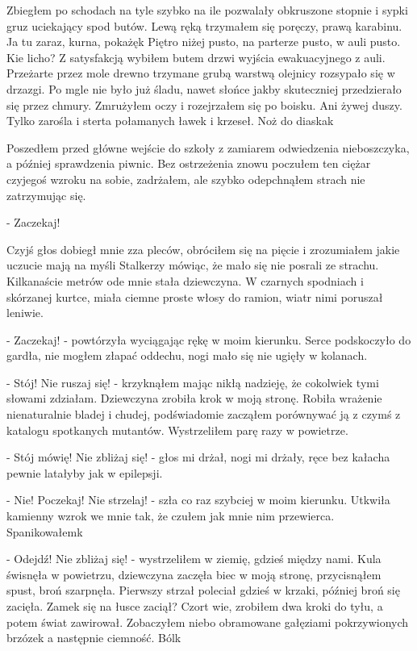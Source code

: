 \documentclass[../MAIN.tex]{subfiles}
\begin{document}
Zbiegłem po schodach na tyle szybko na ile pozwalały obkruszone stopnie i sypki gruz uciekający spod butów. Lewą ręką trzymałem się poręczy, prawą karabinu. Ja tu zaraz, kurna, pokażę\3k Piętro niżej pusto, na parterze pusto, w auli pusto. Kie licho? Z satysfakcją wybiłem butem drzwi wyjścia ewakuacyjnego z auli. Przeżarte przez mole drewno trzymane grubą warstwą olejnicy rozsypało się w drzazgi. Po mgle nie było już śladu, nawet słońce jakby skuteczniej przedzierało się przez chmury. Zmrużyłem oczy i rozejrzałem się po boisku. Ani żywej duszy. Tylko zarośla i sterta połamanych ławek i krzeseł. Noż do diaska\3k

Poszedłem przed główne wejście do szkoły z zamiarem odwiedzenia nieboszczyka, a później sprawdzenia piwnic. Bez ostrzeżenia znowu poczułem ten ciężar czyjegoś wzroku na sobie, zadrżałem, ale szybko odepchnąłem strach nie zatrzymując się.

- Zaczekaj!

Czyjś głos dobiegł mnie zza pleców, obróciłem się na pięcie i zrozumiałem jakie uczucie mają na myśli Stalkerzy mówiąc, że mało się nie posrali ze strachu. Kilkanaście metrów ode mnie stała dziewczyna. W czarnych spodniach i skórzanej kurtce, miała ciemne proste włosy do ramion, wiatr nimi poruszał leniwie.

- Zaczekaj! - powtórzyła wyciągając rękę w moim kierunku. Serce podskoczyło do gardła, nie mogłem złapać oddechu, nogi mało się nie ugięły w kolanach.

- Stój! Nie ruszaj się! - krzyknąłem mając nikłą nadzieję, że cokolwiek tymi słowami zdziałam. Dziewczyna zrobiła krok w moją stronę. Robiła wrażenie nienaturalnie bladej i chudej, podświadomie zacząłem porównywać ją z czymś z katalogu spotkanych mutantów. Wystrzeliłem parę razy w powietrze.

- Stój mówię! Nie zbliżaj się! - głos mi drżał, nogi mi drżały, ręce bez kałacha pewnie latałyby jak w epilepsji.

- Nie! Poczekaj! Nie strzelaj! - szła co raz szybciej w moim kierunku. Utkwiła kamienny wzrok we mnie tak, że czułem jak mnie nim przewierca. Spanikowałem\3k

- Odejdź! Nie zbliżaj się! - wystrzeliłem w ziemię, gdzieś między nami. Kula świsnęła w powietrzu, dziewczyna zaczęła biec w moją stronę, przycisnąłem spust, broń szarpnęła. Pierwszy strzał poleciał gdzieś w krzaki, później broń się zacięła. Zamek się na łusce zaciął? Czort wie, zrobiłem dwa kroki do tyłu, a potem świat zawirował. Zobaczyłem niebo obramowane gałęziami pokrzywionych brzózek a następnie ciemność. Ból\3k
\end{document}
